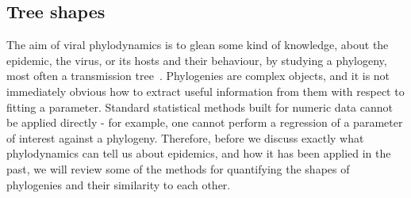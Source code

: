 %
%
%
%


\newpage

\subsection{Tree shapes}
\label{subsubsec:treeshape}

The aim of viral phylodynamics is to glean some kind of knowledge, about the
epidemic, the virus, or its hosts and their behaviour, by studying a phylogeny,
most often a transmission tree~\autocite{pybus2009evolutionary, volz2013viral}.
Phylogenies are complex objects, and it is not immediately obvious how to
extract useful information from them with respect to fitting a parameter.
Standard statistical methods built for numeric data cannot be applied directly
- for example, one cannot perform a regression of a parameter of interest
against a phylogeny. Therefore, before we discuss exactly what phylodynamics
can tell us about epidemics, and how it has been applied in the past, we will
review some of the methods for quantifying the shapes of phylogenies and their
similarity to each other.


